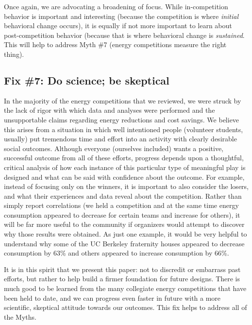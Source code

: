 \documentclass[jou]{apa} %
\begin{document}
Once again, we are advocating a broadening of focus.   While in-competition behavior is
important and interesting (because the competition is where {\em initial} behavioral change
occurs), it is equally if not more important to learn about post-competition behavior
(because that is where behavioral change is {\em sustained}.  This will help to address
Myth \#7 (energy competitions measure the right thing).

\subsection{Fix \#7: Do science; be skeptical}

In the majority of the energy competitions that we reviewed, we were struck by the lack of
rigor with which data and analyses were performed and the unsupportable claims regarding
energy reductions and cost savings.  We believe this arises from a situation in which well
intentioned people (volunteer students, usually) put tremendous time and effort into an
activity with clearly desirable social outcomes.  Although everyone (ourselves included)
wants a positive, successful outcome from all of these efforts, progress depends upon a
thoughtful, critical analysis of how each instance of this particular type of meaningful
play is designed and what can be said with confidence about the outcome.  For example,
instead of focusing only on the winners, it is important to also consider the losers, and
what their experiences and data reveal about the competition.  Rather than simply report
correlations (we held a competition and at the same time energy consumption appeared to
decrease for certain teams and increase for others), it will be far more useful to the
community if organizers would attempt to discover why those results were obtained.  As
just one example, it would be very helpful to understand why some of the UC Berkeley
fraternity houses appeared to decrease consumption by 63\% and others appeared to increase
consumption by 66\%. 

It is in this spirit that we present this paper: not to discredit or embarrass past
efforts, but rather to help build a firmer foundation for future designs.  There is much
good to be learned from the many collegiate energy competitions that have been held to
date, and we can progress even faster in future with a more scientific, skeptical attitude
towards our outcomes.  This fix helps to address all of the Myths.


\end{document}
